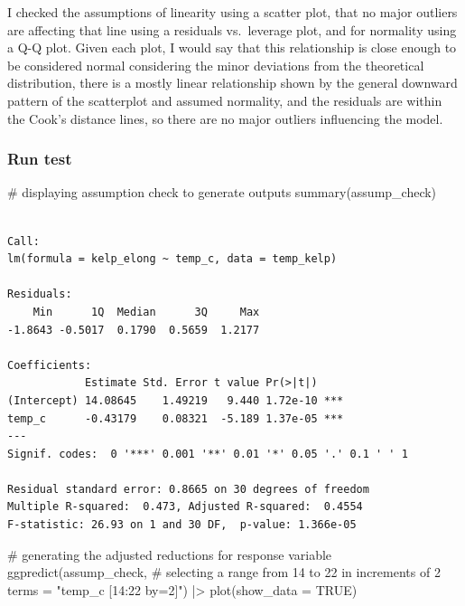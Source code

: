 \documentclass[
  letterpaper,
  DIV=11,
  numbers=noendperiod]{scrartcl}
\newenvironment{Shaded}{\begin{snugshade}}{\end{snugshade}}
\newcommand{\AttributeTok}[1]{\textcolor[rgb]{0.40,0.45,0.13}{#1}}
\newcommand{\CommentTok}[1]{\textcolor[rgb]{0.37,0.37,0.37}{#1}}
\newcommand{\ConstantTok}[1]{\textcolor[rgb]{0.56,0.35,0.01}{#1}}
\newcommand{\FunctionTok}[1]{\textcolor[rgb]{0.28,0.35,0.67}{#1}}
\newcommand{\NormalTok}[1]{\textcolor[rgb]{0.00,0.23,0.31}{#1}}
\newcommand{\SpecialCharTok}[1]{\textcolor[rgb]{0.37,0.37,0.37}{#1}}
\newcommand{\StringTok}[1]{\textcolor[rgb]{0.13,0.47,0.30}{#1}}
\begin{document}
I checked the assumptions of linearity using a scatter plot, that no
major outliers are affecting that line using a residuals vs.~leverage
plot, and for normality using a Q-Q plot. Given each plot, I would say
that this relationship is close enough to be considered normal
considering the minor deviations from the theoretical distribution,
there is a mostly linear relationship shown by the general downward
pattern of the scatterplot and assumed normality, and the residuals are
within the Cook's distance lines, so there are no major outliers
influencing the model.

\subsubsection{Run test}\label{run-test}

\begin{Shaded}
\begin{Highlighting}[]
\CommentTok{\# displaying assumption check to generate outputs}
\FunctionTok{summary}\NormalTok{(assump\_check)}
\end{Highlighting}
\end{Shaded}

\begin{verbatim}

Call:
lm(formula = kelp_elong ~ temp_c, data = temp_kelp)

Residuals:
    Min      1Q  Median      3Q     Max 
-1.8643 -0.5017  0.1790  0.5659  1.2177 

Coefficients:
            Estimate Std. Error t value Pr(>|t|)    
(Intercept) 14.08645    1.49219   9.440 1.72e-10 ***
temp_c      -0.43179    0.08321  -5.189 1.37e-05 ***
---
Signif. codes:  0 '***' 0.001 '**' 0.01 '*' 0.05 '.' 0.1 ' ' 1

Residual standard error: 0.8665 on 30 degrees of freedom
Multiple R-squared:  0.473, Adjusted R-squared:  0.4554 
F-statistic: 26.93 on 1 and 30 DF,  p-value: 1.366e-05
\end{verbatim}

\begin{Shaded}
\begin{Highlighting}[]
\CommentTok{\# generating the adjusted reductions for response variable}
\FunctionTok{ggpredict}\NormalTok{(assump\_check,}
          \CommentTok{\# selecting a range from 14 to 22 in increments of 2}
          \AttributeTok{terms =} \StringTok{"temp\_c [14:22 by=2]"}\NormalTok{) }\SpecialCharTok{|\textgreater{}} 
  \FunctionTok{plot}\NormalTok{(}\AttributeTok{show\_data =} \ConstantTok{TRUE}\NormalTok{)}
\end{Highlighting}
\end{Shaded}
\end{document}
